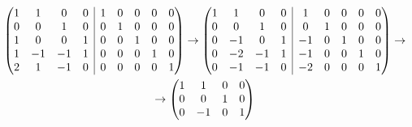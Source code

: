\documentclass[11pt,a4paper]{article}
\newcommand{\rvline}{\hspace*{-\arraycolsep}\vline\hspace*{-\arraycolsep}}
\begin{document}
\begin{enumerate}
\begin{enumerate}
\begin{multline*}
            \begin{pmatrix}
            \begin{matrix}
            1 & 1 & 0 & 0 \\
            0 & 0 & 1 & 0 \\
            1 & 0 & 0 & 1 \\
            1 & -1 & -1 & 1 \\
            2 & 1 & -1 & 0 \\
            \end{matrix} & \rvline & \begin{matrix}
            1 & 0 & 0 & 0 & 0  \\
            0 & 1 & 0 & 0 & 0  \\
            0 & 0 & 1 & 0 & 0  \\
            0 & 0 & 0 & 1 & 0  \\
            0 & 0 & 0 & 0 & 1 \\
            \end{matrix}
            \end{pmatrix}\rightarrow\begin{pmatrix}
            \begin{matrix}
            1 & 1 & 0 & 0 \\
            0 & 0 & 1 & 0 \\
            0 & -1 & 0 & 1 \\
            0 & -2 & -1 & 1 \\
            0 & -1 & -1 & 0 \\
            \end{matrix} & \rvline & \begin{matrix}
            1 & 0 & 0 & 0 & 0  \\
            0 & 1 & 0 & 0 & 0  \\
            -1 & 0 & 1 & 0 & 0  \\
            -1 & 0 & 0 & 1 & 0  \\
            -2 & 0 & 0 & 0 & 1 \\
            \end{matrix}
            \end{pmatrix}\rightarrow \\ \rightarrow\begin{pmatrix}
            \begin{matrix}
            1 & 1 & 0 & 0 \\
            0 & 0 & 1 & 0 \\
            0 & -1 & 0 & 1 \\

\end{matrix}
\end{pmatrix}
\end{multline*}
\end{enumerate}
\end{enumerate}
\end{document}
